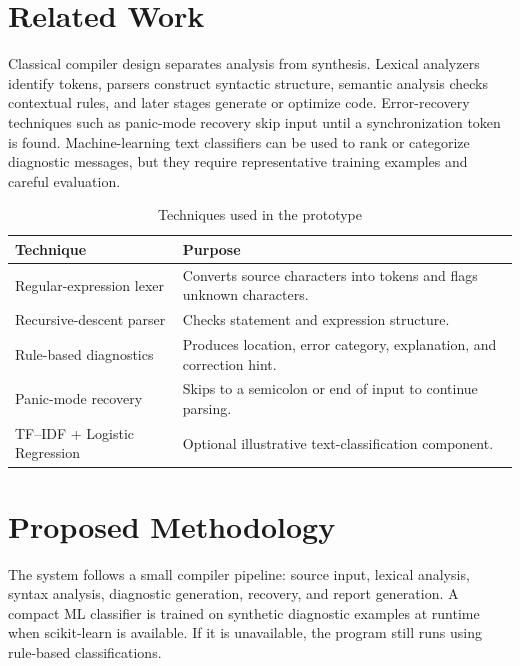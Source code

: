 \documentclass[12pt,a4paper]{article}
\begin{document}
\section{Related Work}
Classical compiler design separates analysis from synthesis. Lexical analyzers identify tokens, parsers construct syntactic structure, semantic analysis checks contextual rules, and later stages generate or optimize code. Error-recovery techniques such as panic-mode recovery skip input until a synchronization token is found. Machine-learning text classifiers can be used to rank or categorize diagnostic messages, but they require representative training examples and careful evaluation.

\begin{table}[H]
\centering
\caption{Techniques used in the prototype}
\begin{tabularx}{\textwidth}{p{3cm}X}
\toprule
\textbf{Technique} & \textbf{Purpose}\\\midrule
Regular-expression lexer & Converts source characters into tokens and flags unknown characters.\\
Recursive-descent parser & Checks statement and expression structure.\\
Rule-based diagnostics & Produces location, error category, explanation, and correction hint.\\
Panic-mode recovery & Skips to a semicolon or end of input to continue parsing.\\
TF--IDF + Logistic Regression & Optional illustrative text-classification component.\\
\bottomrule
\end{tabularx}
\end{table}

\section{Proposed Methodology}
The system follows a small compiler pipeline: source input, lexical analysis, syntax analysis, diagnostic generation, recovery, and report generation. A compact ML classifier is trained on synthetic diagnostic examples at runtime when scikit-learn is available. If it is unavailable, the program still runs using rule-based classifications.
\end{document}
